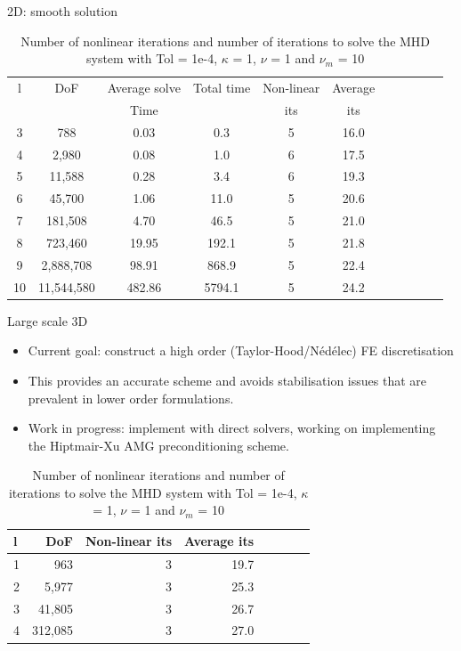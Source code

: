 \documentclass[12pt]{beamer}
\begin{document}
\begin{frame}{2D: smooth solution}
\begin{table} \footnotesize

\centering
\begin{tabular}{ccccccccccc}
\hline
 l &       DoF &  Average solve &  Total time &  Non-linear  & Average   \\
 & & Time & &its & its\\
\hline
  3 &       788 &       0.03 &           0.3 & 5 &     16.0 \\
  4 &      2,980 &       0.08 &           1.0 & 6 &     17.5 \\
  5 &     11,588 &       0.28 &           3.4 & 6 &     19.3 \\
  6 &     45,700 &       1.06 &          11.0 & 5 &     20.6 \\
  7 &    181,508 &       4.70 &          46.5 & 5 &     21.0 \\
  8 &    723,460 &      19.95 &         192.1 & 5 &     21.8 \\
  9 &   2,888,708 &      98.91 &         868.9 & 5 &     22.4 \\
 10 &  11,544,580 &     482.86 &        5794.1 & 5 &     24.2 \\
\hline
\end{tabular}
\caption{Number of nonlinear iterations and number of iterations to solve the MHD system with Tol = 1e-4, $\kappa$ = 1, $\nu$ = 1 and $\nu_m$ = 10}
\label{tab:MaxEigenvalues}
\end{table}

\end{frame}

\begin{frame}{Large scale 3D}
\begin{itemize}
\item Current goal: construct a high order (Taylor-Hood/{N\'{e}d\'{e}lec}) FE discretisation
\item This provides an accurate scheme and avoids stabilisation issues that are prevalent in lower order formulations.
\item Work in progress: implement with direct solvers, working on implementing the Hiptmair-Xu AMG preconditioning scheme.
\end{itemize}


\begin{table} \footnotesize
\centering
\begin{tabular}{lrrrrrll}
\hline
 l &       DoF &   Non-linear its  & Average its  \\
\hline
1 &     963 &                  3 &         19.7 \\
2 &    5,977 &                  3 &         25.3 \\
3 &   41,805 &                  3 &         26.7 \\
4 &  312,085 &                  3 &         27.0 \\
\hline
\end{tabular}
\caption{Number of nonlinear iterations and number of iterations to solve the MHD system with Tol = 1e-4, $\kappa$ = 1, $\nu$ = 1 and $\nu_m$ = 10}
\end{table}
\end{frame}
\end{document}
